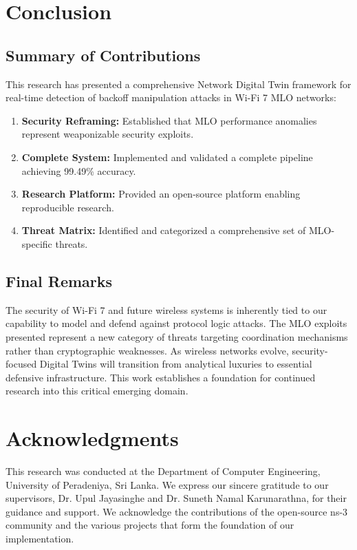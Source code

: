 \documentclass[12pt,a4paper]{article}
\begin{document}
\section{Conclusion}

\subsection{Summary of Contributions}

This research has presented a comprehensive Network Digital Twin framework for real-time detection of backoff manipulation attacks in Wi-Fi 7 MLO networks:

\begin{enumerate}
    \item \textbf{Security Reframing:} Established that MLO performance anomalies represent weaponizable security exploits.
    \item \textbf{Complete System:} Implemented and validated a complete pipeline achieving 99.49\% accuracy.
    \item \textbf{Research Platform:} Provided an open-source platform enabling reproducible research.
    \item \textbf{Threat Matrix:} Identified and categorized a comprehensive set of MLO-specific threats.
\end{enumerate}

\subsection{Final Remarks}

The security of Wi-Fi 7 and future wireless systems is inherently tied to our capability to model and defend against protocol logic attacks. The MLO exploits presented represent a new category of threats targeting coordination mechanisms rather than cryptographic weaknesses. As wireless networks evolve, security-focused Digital Twins will transition from analytical luxuries to essential defensive infrastructure. This work establishes a foundation for continued research into this critical emerging domain.

\section*{Acknowledgments}

This research was conducted at the Department of Computer Engineering, University of Peradeniya, Sri Lanka. We express our sincere gratitude to our supervisors, Dr. Upul Jayasinghe and Dr. Suneth Namal Karunarathna, for their guidance and support. We acknowledge the contributions of the open-source ns-3 community and the various projects that form the foundation of our implementation.
\end{document}
